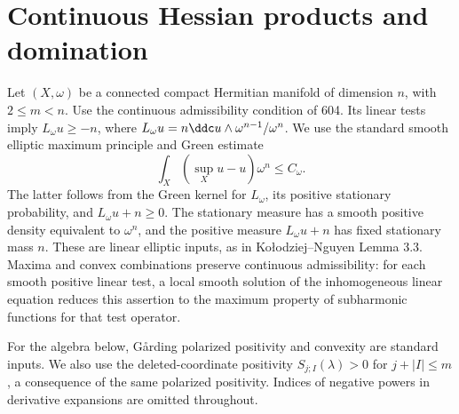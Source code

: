 \section{Continuous Hessian products and domination}

Let $(X,\omega)$ be a connected compact Hermitian manifold of dimension
$n$, with $2\leq m<n$. Use the continuous admissibility condition of
604. Its linear tests imply $L_\omega u\geq-n$, where
$L_\omega u=n\ddc u\wedge\omega^{n-1}/\omega^n$.
We use the standard smooth elliptic maximum principle and Green estimate
\[
 \int_X(\sup_X u-u)\omega^n\leq C_\omega.
\]
The latter follows from the Green kernel for $L_\omega$, its positive
stationary probability, and $L_\omega u+n\geq0$. The stationary measure has
a smooth positive density equivalent to $\omega^n$, and the positive
measure $L_\omega u+n$ has fixed stationary mass $n$.
These are linear elliptic inputs, as in Ko\l odziej--Nguyen Lemma 3.3.
Maxima and convex combinations preserve continuous admissibility:
for each smooth positive linear test, a local smooth solution of the
inhomogeneous linear equation reduces this assertion to the maximum
property of subharmonic functions for that test operator.

For the algebra below, G\aa rding polarized positivity and convexity
are standard inputs. We also use the deleted-coordinate positivity
$S_{j;I}(\lambda)>0$ for $j+|I|\leq m$, a consequence of the same
polarized positivity. Indices of negative powers in derivative expansions
are omitted throughout.

